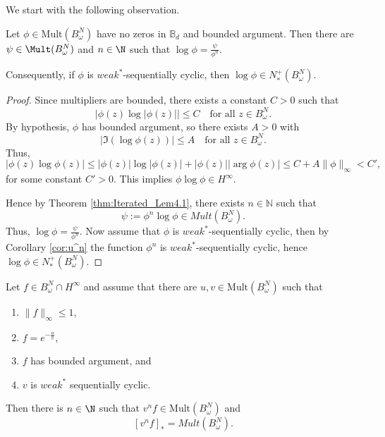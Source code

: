 \documentclass{article}
\numberwithin{equation}{section}
\begin{document}
We start with the following observation.
\begin{thm}\label{thm:log=ratio}
    Let $\phi \in \mathrm{Mult}(B^{N}_{\omega})$ have no zeros in  $\mathbb{B}_d$ and bounded argument.
    Then there are $ \psi \in \Mult(B^N_\omega)$ and $n\in \N$ such that $\log \phi= \frac{\psi}{\phi^n}$. 
    
    Consequently, if $\phi$ is $weak^\ast$-sequentially cyclic, then $\log \phi \in N^+_\ast(B^N_\omega)$.
\end{thm}
\begin{proof}
    Since multipliers are bounded, there  exists a constant $C > 0$ such that
\[
|\phi(z) \log |\phi(z)|| \leq C \quad \text{for all } z \in B^{N}_{\omega}.
\]
By hypothesis, $\phi$ has bounded argument, so there exists $A > 0$ with
\[
|\Im (\log \phi(z))| \leq A \quad \text{for all } z \in B^{N}_{\omega}.
\]
Thus,
\[
|\phi(z) \log \phi(z)| \leq |\phi(z)| \log|\phi(z)| + |\phi(z)| |\arg \phi(z)| \leq C + A \|\phi\|_\infty < C',
\]
for some constant $C' > 0$. This implies $\phi \log \phi \in H^\infty$.  

Hence by Theorem \ref{thm:Iterated_Lem4.1}, there exists $n \in \mathbb{N}$ such that 
\[
\psi:= \phi^n \log \phi \in Mult(B^{N}_{\omega}).
\]
Thus, $\log \phi= \frac{\psi}{\phi^n}$.
Now assume that $\phi$ is $weak^\ast$-sequentially cyclic, then by Corollary \ref{cor:u^n} the function $\phi^n$ is $weak^\ast$-sequentially cyclic, hence  $\log \phi\in N^+_\ast(B^N_\omega)$.
\end{proof}



\begin{lem}\label{lem:weak*log}
Let $f \in B^{N}_{\omega} \cap H^{\infty}$ and assume that there are  $u,v\in \mathrm{Mult}(B^N_\omega)$ such that
\begin{enumerate}
\item $\|f\|_\infty\le 1$,
\item $f=e^{-\frac{u}{v}}$,
\item $f$ has bounded argument, and
\item $v$ is $weak^\ast$ sequentially cyclic.
\end{enumerate}
 Then there is $n\in\N$ such that $v^n f\in \mathrm{Mult}(B^N_\omega)$ and
\[
 [v^n f]_{*} = Mult(B^{N}_{\omega}).
\]
\end{lem}
\end{document}
